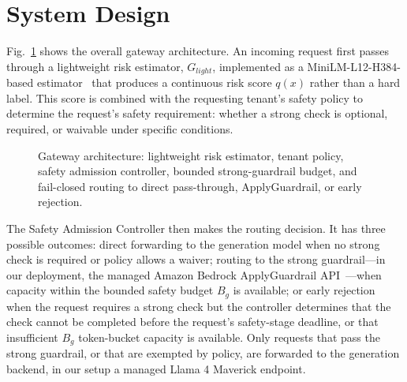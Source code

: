 \documentclass[conference]{IEEEtran}
\newcommand{\Glight}{G_{\mathit{light}}}
\newcommand{\Bg}{B_g}
\begin{document}
\section{System Design}
\label{sec:design}

Fig.~\ref{fig:arch} shows the overall gateway architecture. An incoming request first passes through a lightweight risk estimator, $\Glight$, implemented as a MiniLM-L12-H384-based estimator~\cite{wang2020minilm} that produces a continuous risk score $q(x)$ rather than a hard label. This score is combined with the requesting tenant's safety policy to determine the request's safety requirement: whether a strong check is optional, required, or waivable under specific conditions.

\begin{figure}[t]
\centering
{}
\caption{Gateway architecture: lightweight risk estimator, tenant policy, safety admission controller, bounded strong-guardrail budget, and fail-closed routing to direct pass-through, ApplyGuardrail, or early rejection.}
\label{fig:arch}
\end{figure}

The Safety Admission Controller then makes the routing decision. It has three possible outcomes: direct forwarding to the generation model when no strong check is required or policy allows a waiver; routing to the strong guardrail---in our deployment, the managed Amazon Bedrock ApplyGuardrail API~\cite{aws_applyguardrail}---when capacity within the bounded safety budget $\Bg$ is available; or early rejection when the request requires a strong check but the controller determines that the check cannot be completed before the request's safety-stage deadline, or that insufficient $\Bg$ token-bucket capacity is available. Only requests that pass the strong guardrail, or that are exempted by policy, are forwarded to the generation backend, in our setup a managed Llama 4 Maverick endpoint.
\end{document}
